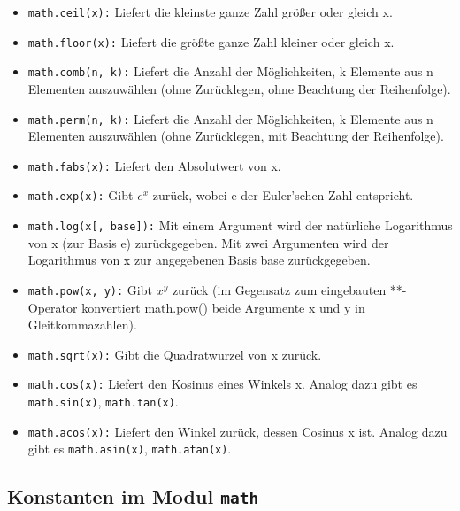 \documentclass[11pt, oneside]{book}
\begin{document}
\begin{itemize}
    \item \texttt{math.ceil(x):} Liefert die kleinste ganze Zahl größer oder gleich x.
    
    \item \texttt{math.floor(x):} Liefert die größte ganze Zahl kleiner oder gleich x.
    
    \item \texttt{math.comb(n, k):} Liefert die Anzahl der Möglichkeiten, k Elemente aus n Elementen auszuwählen (ohne Zurücklegen, ohne Beachtung der Reihenfolge).
    
    \item \texttt{math.perm(n, k):} Liefert die Anzahl der Möglichkeiten, k Elemente aus n Elementen auszuwählen (ohne Zurücklegen, mit Beachtung der Reihenfolge).
    
    \item \texttt{math.fabs(x):} Liefert den Absolutwert von x.
    
    \item \texttt{math.exp(x):} Gibt $e^x$ zurück, wobei e der Euler'schen Zahl entspricht.
    
    \item \texttt{math.log(x[, base]):} Mit einem Argument wird der natürliche Logarithmus von x (zur Basis e) zurückgegeben. Mit zwei Argumenten wird der Logarithmus von x zur angegebenen Basis base zurückgegeben.
    
    \item \texttt{math.pow(x, y):} Gibt $x^y$ zurück (im Gegensatz zum eingebauten **-Operator konvertiert math.pow() beide Argumente x und y in Gleitkommazahlen).
    
    \item \texttt{math.sqrt(x):} Gibt die Quadratwurzel von x zurück.
    
    \item \texttt{math.cos(x):} Liefert den Kosinus eines Winkels x. Analog dazu gibt es \texttt{math.sin(x)}, \texttt{math.tan(x)}.
    
    \item \texttt{math.acos(x):} Liefert den Winkel zurück, dessen Cosinus x ist. Analog dazu gibt es \texttt{math.asin(x)}, \texttt{math.atan(x)}.
\end{itemize}

\subsection{Konstanten im Modul \texttt{math}}
\end{document}
